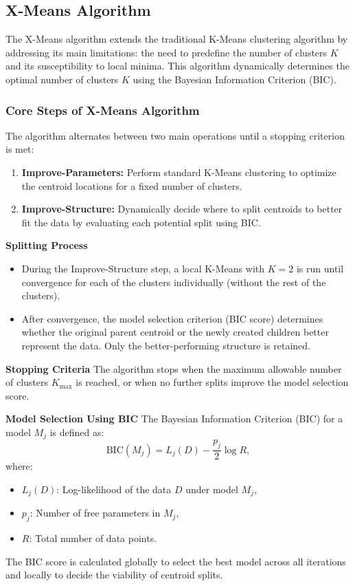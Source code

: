 \subsection{X-Means Algorithm}

The X-Means algorithm extends the traditional K-Means clustering algorithm by addressing its main limitations:
the need to predefine the number of clusters \( K \)
and its susceptibility to local minima. This algorithm dynamically determines the optimal number of clusters \( K \) using the Bayesian Information Criterion (BIC).
\cite{Moore2002}


\subsubsection{Core Steps of X-Means Algorithm}

The algorithm alternates between two main operations until a stopping criterion is met:

\begin{enumerate}
    \item \textbf{Improve-Parameters:} Perform standard K-Means clustering to optimize the centroid locations for a fixed number of clusters.
    \item \textbf{Improve-Structure:} Dynamically decide where to split centroids to better fit the data by evaluating each potential split using BIC.
\end{enumerate}

\textbf{Splitting Process}
\begin{itemize}
    \item During the Improve-Structure step, a local K-Means with \( K = 2 \) is run until convergence for each of the clusters individually (without the rest of the clusters).
    \item After convergence, the model selection criterion (BIC score) determines whether the original parent centroid or the newly created children better represent the data. Only the better-performing structure is retained.
\end{itemize}

\textbf{Stopping Criteria}
The algorithm stops when the maximum allowable number of clusters \( K_{\text{max}} \) is reached, or when no further splits improve the model selection score.

\textbf{Model Selection Using BIC}
The Bayesian Information Criterion (BIC) for a model \( M_j \) is defined as:
\[
\text{BIC}(M_j) = L_j(D) - \frac{p_j}{2} \log R,
\]
where:
\begin{itemize}
    \item \( L_j(D) \): Log-likelihood of the data \( D \) under model \( M_j \),
    \item \( p_j \): Number of free parameters in \( M_j \),
    \item \( R \): Total number of data points.
\end{itemize}
The BIC score is calculated globally to select the best model across all iterations and locally to decide the viability of centroid splits.
